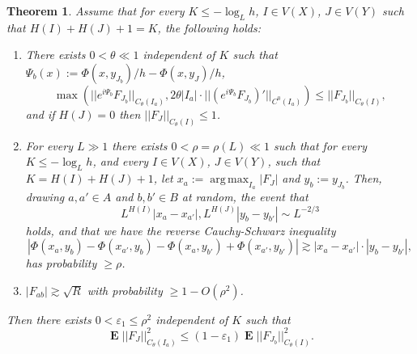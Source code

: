 \documentclass[reqno,10pt]{amsart}
\DeclareMathOperator*{\Expect}{\mathbf E}
\DeclareMathOperator*{\argmax}{arg\,max}
\newtheorem{theorem}{Theorem}[section]
\theoremstyle{definition}
\numberwithin{equation}{section}
\begin{document}
\begin{theorem}
Assume that for every $K \leq -\log_L h$, $I \in V(X)$, $J \in V(Y)$ such that $H(I) + H(J) + 1 = K$, the following holds:
\begin{enumerate}
\item There exists $0 < \theta \ll 1$ independent of $K$ such that $\Psi_b(x) := \Phi(x, y_{J_b})/h - \Phi(x, y_J)/h$,
\begin{equation}\label{assumption on theta}
\max\left(||e^{i\Psi_b} F_{J_b}||_{C_\theta(I_a)}, 2\theta |I_a| \cdot ||(e^{i\Psi_b} F_{J_b})'||_{C^0(I_a)}\right) \leq ||F_{J_b}||_{C_\theta(I)},
\end{equation}
and if $H(J) = 0$ then $||F_J||_{C_\theta(I)} \leq 1$.
\item For every $L \gg 1$ there exists $0 < \rho = \rho(L) \ll 1$ such that for every $K \leq -\log_L h$, and every $I \in V(X)$, $J \in V(Y)$, such that $K = H(I) + H(J) + 1$, let $x_a := \argmax_{I_a} |F_J|$ and $y_b := y_{J_b}$. Then, drawing $a, a' \in A$ and $b, b' \in B$ at random, the event that
\begin{equation}\label{comparable lengths}
L^{H(I)} |x_a - x_{a'}|, L^{H(J)} |y_b - y_{b'}| \sim L^{-2/3}
\end{equation}
holds, and that we have the reverse Cauchy-Schwarz inequality
\begin{equation}\label{Reverse Cauchy Schwarz}
|\Phi(x_a, y_b) - \Phi(x_{a'}, y_b) - \Phi(x_a, y_{b'}) + \Phi(x_{a'}, y_{b'})| \gtrsim |x_a - x_{a'}| \cdot |y_b - y_{b'}|,
\end{equation}
has probability $\geq \rho$.
\item $|F_{ab}| \gtrsim \sqrt R$ with probability $\geq 1 - O(\rho^2)$.
\end{enumerate}
Then there exists $0 < \varepsilon_1 \leq \rho^2$ independent of $K$ such that
\begin{equation}\label{improved volume bound}
\Expect ||F_J||_{C_\theta(I_a)}^2 \leq (1 - \varepsilon_1) \Expect ||F_{J_b}||_{C_\theta(I)}^2.
\end{equation}
\end{theorem}
\end{document}

